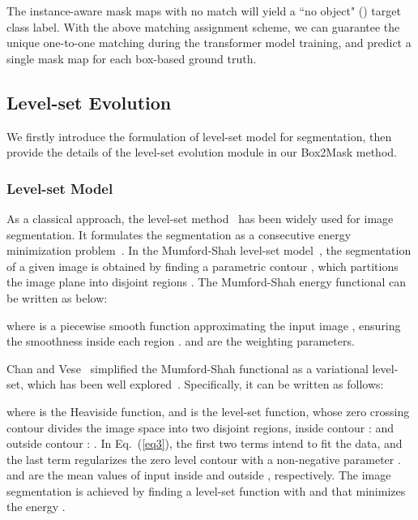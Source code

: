 \documentclass[12pt,onecolumn,letterpaper]{article}
\begin{document}
The instance-aware mask maps with no match will yield a ``no object" () target class label. With the above matching assignment scheme, we can guarantee the unique one-to-one matching during the transformer model training, and predict a single mask map for each box-based ground truth.


\subsection{Level-set Evolution} 
\label{section3.3}

We firstly introduce the formulation of level-set model for segmentation, then provide the details of the level-set evolution module in our Box2Mask method.

\subsubsection{Level-set Model}
As a classical approach, the level-set method~\cite{levelset1995a, osher1988fronts} has been widely used for image segmentation. It formulates the segmentation as a consecutive energy minimization problem~\cite{mumford1989optimal, tip2001_active_contour, ijcv2002multiphase}.
In the Mumford-Shah level-set model~\cite{mumford1989optimal}, the segmentation of a given image  is obtained by finding a parametric contour , which partitions the image plane  into  disjoint regions . The Mumford-Shah energy functional  can be written as below:
\begin{normalsize}
	
\end{normalsize}

\noindent where  is a piecewise smooth function approximating the input image , ensuring the smoothness inside each region .  and  are the weighting parameters.

Chan and Vese~\cite{tip2001_active_contour} simplified the Mumford-Shah functional as a variational level-set, which has been well explored~\cite{wang2010efficient,liu2012local,mavska2013segmentation,xu2011image}. Specifically, it can be written as follows:
\begin{normalsize}
	
\end{normalsize}

\noindent
where  is the Heaviside function, and  is the level-set function, whose zero crossing contour  divides the image space  into two disjoint regions, 
inside contour :  and outside contour : . 
In Eq.~(\ref{eq3}), the first two terms intend to fit the data, and the last term regularizes the zero level contour with a non-negative parameter .  and  are the mean values of input  inside  and outside , respectively. The image segmentation is achieved by finding a level-set function  with  and  that minimizes the energy .
\end{document}
